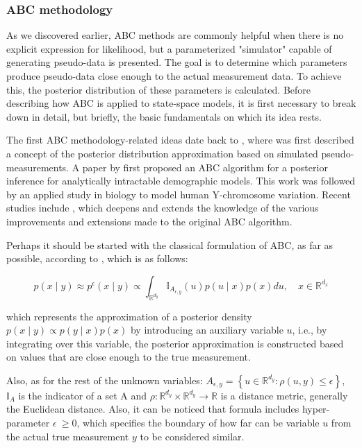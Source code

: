 \subsubsection{ABC methodology}
As we discovered earlier, ABC methods are commonly helpful when there is no explicit expression for likelihood, but a parameterized "simulator" capable of generating pseudo-data is presented. The goal is to determine which parameters produce pseudo-data close enough to the actual measurement data. To achieve this, the posterior distribution of these parameters is calculated. Before describing how ABC is applied to state-space models, it is first necessary to break down in detail, but briefly, the basic fundamentals on which its idea rests.

The first ABC methodology-related ideas date back to \cite{rubin_bayesianly_1984}, where was first described a concept of the posterior distribution approximation based on simulated pseudo-measurements. A paper by \cite{tavare_inferring_1997} first proposed an ABC algorithm for a posterior inference for analytically intractable demographic models. This work was followed by \cite{pritchard_population_1999} an applied study in biology to model human Y-chromosome variation. Recent studies include \cite{marin_approximate_2012}, which deepens and extends the knowledge of the various improvements and extensions made to the original ABC algorithm.

Perhaps it should be started with the classical formulation of ABC, as far as possible, according to \cite{jasra_filtering_2012}, which is as follows:

\begin{equation}
    p\left(x \mid y \right) \approx p^\epsilon \left(x \mid y\right) \propto \int_{\mathbb{R}^{d_y}} \mathbb{I}_{A_{\epsilon, y}}\left(u\right) p\left(u \mid x\right) p\left(x\right) d u, \quad x \in \mathbb{R}^{d_x}
    \label{eq:abc_apporximation_of_posterior_by_auxiliary_variable}
\end{equation}

\noindent which represents the approximation of a posterior density \(  p\left(x \mid y \right) \propto p\left(y \mid x\right) p\left(x\right) \) by introducing an auxiliary variable \(u\), i.e., by integrating over this variable, the posterior approximation is constructed based on values that are close enough to the true measurement.

Also, as for the rest of the unknown variables: \(A_{\epsilon, y}=\left\{u \in \mathbb{R}^{d_y}: \rho\left(u, y\right) \leq \epsilon\right\}\), \(\mathbb{I}_{A}\) is the indicator of a set A and \(\rho:\mathbb{R}^{d_y} \times \mathbb{R}^{d_y} \rightarrow \mathbb{R} \) is a distance metric, generally the Euclidean distance. Also, it can be noticed that formula includes hyper-parameter \(\epsilon\ \geqslant 0\), which specifies the boundary of how far can be variable \(u\) from the actual true measurement \(y\) to be considered similar.

